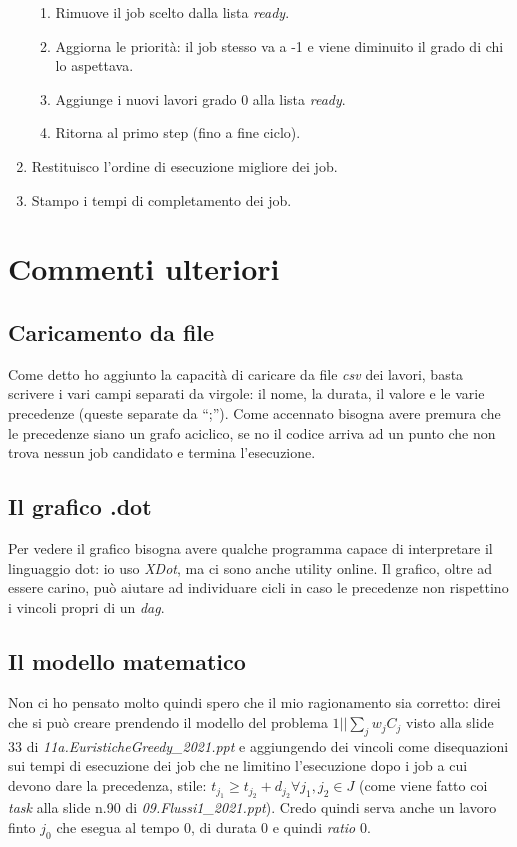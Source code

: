 \documentclass[12pt, letterpaper]{article}
\begin{document}
\begin{enumerate}
{\begin{enumerate}
\item{Rimuove il job scelto dalla lista \textit{ready}.}
\item{Aggiorna le priorità: il job stesso va a -1 e viene diminuito il grado di chi lo aspettava.}
\item{Aggiunge i nuovi lavori grado 0 alla lista \textit{ready}.} 
\item{Ritorna al primo step (fino a fine ciclo).}
\end{enumerate}}
\item{Restituisco l'ordine di esecuzione migliore dei job.}
\item{Stampo i tempi di completamento dei job.}
\end{enumerate}

\section{Commenti ulteriori}

\subsection{Caricamento da file}
Come detto ho aggiunto la capacità di caricare da file \textit{csv} dei lavori, basta scrivere i vari campi separati da virgole: il nome, la durata, il valore e le varie precedenze (queste separate da ``;'').
Come accennato bisogna avere premura che le precedenze siano un grafo aciclico, se no il codice arriva ad un punto che non trova nessun job candidato e termina l'esecuzione.
\subsection{Il grafico .dot}
Per vedere il grafico bisogna avere qualche programma capace di interpretare il linguaggio dot: io uso \textit{XDot}, ma ci sono anche utility online.
Il grafico, oltre ad essere carino, può aiutare ad individuare cicli in caso le precedenze non rispettino i vincoli propri di un \textit{dag}.
\subsection{Il modello matematico}
Non ci ho pensato molto quindi spero che il mio ragionamento sia corretto: direi che si può creare prendendo il modello del problema $1||\sum_j w_j C_j$ visto alla slide 33 di \textit{11a.EuristicheGreedy\_2021.ppt} e aggiungendo dei vincoli come disequazioni sui tempi di esecuzione dei job che ne limitino l'esecuzione dopo i job a cui devono dare la precedenza, stile: $t_{j_1} \geq t_{j_2} + d_{j_2} \forall j_1,j_2 \in J$ (come viene fatto coi \textit{task} alla slide n.90 di \textit{09.Flussi1\_2021.ppt}). Credo quindi serva anche un lavoro finto $j_0$ che esegua al tempo 0, di durata 0 e quindi \textit{ratio} 0. 


\printbibliography
\end{document}
